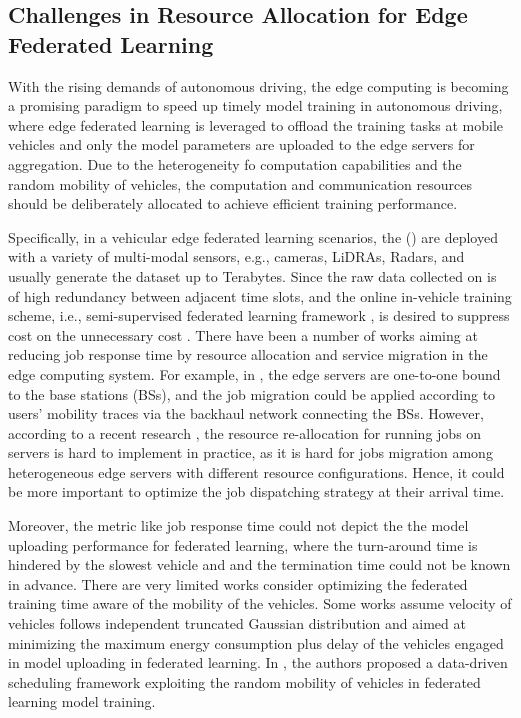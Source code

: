 \subsection{Challenges in Resource Allocation for Edge Federated Learning}
With the rising demands of autonomous driving, the edge computing is becoming a promising paradigm to speed up timely model training in autonomous driving, where edge federated learning is leveraged to offload the training tasks at mobile vehicles and only the model parameters are uploaded to the edge servers for aggregation.
Due to the heterogeneity fo computation capabilities and the random mobility of vehicles, the computation and communication resources should be deliberately allocated to achieve efficient training performance.

Specifically, in a vehicular edge federated learning scenarios, the {\IAVFullnames} ({\IAVs}) are deployed with a variety of multi-modal sensors, e.g., cameras, LiDRAs, Radars, and usually generate the dataset up to Terabytes.
Since the raw data collected on {\IAVs} is of high redundancy between adjacent time slots, and the online in-vehicle training scheme, i.e., semi-supervised federated learning framework \cite{icra2021-hong}, is desired to suppress cost on the unnecessary cost \cite{vfl-survey}.
There have been a number of works aiming at reducing job response time by resource allocation and service migration in the edge computing system.
For example, in \cite{TON19-WangSq}, the edge servers are one-to-one bound to the base stations (BSs), and the job migration could be applied according to users' mobility traces via the backhaul network connecting the BSs.
However, according to a recent research \cite{INFOCOM19-WuC}, the resource re-allocation for running jobs on servers is hard to implement in practice, as it is hard for jobs migration among heterogeneous edge servers with different resource configurations.
Hence, it could be more important to optimize the job dispatching strategy at their arrival time.

Moreover, the metric like job response time could not depict the the model uploading performance for federated learning, where the turn-around time is hindered by the slowest vehicle and and the termination time could not be known in advance.
There are very limited works \cite{tvt2020-hong,commag2022-hong,tcom2022-hong} consider optimizing the federated training time aware of the mobility of the vehicles.
Some works assume velocity of vehicles follows independent truncated Gaussian distribution and aimed at minimizing the maximum energy consumption plus delay of the vehicles engaged in model uploading in federated learning.
In \cite{tvt2020-hong}, the authors proposed a data-driven scheduling framework exploiting the random mobility of vehicles in federated learning model training.


